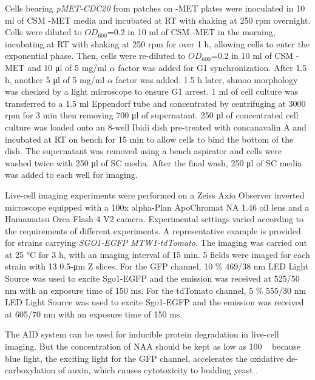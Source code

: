 Cells bearing \textit{pMET-CDC20} from patches on -MET plates were inoculated in 10 \si{\milli\litre} of CSM -MET media and incubated at RT with shaking at 250 rpm overnight. Cells were diluted to $OD_{600}$=0.2 in 10 \si{\milli\litre} of CSM -MET in the morning, incubating at RT with shaking at 250 rpm for over 1 \si{\hour}, allowing cells to enter the exponential phase. Then, cells were re-diluted to $OD_{600}$=0.2 in 10 \si{\milli\litre} of CSM -MET and 10 \si{\micro\litre} of 5 \si{\milli\gram/\milli\litre} $\alpha$ factor was added for G1 synchronization. After 1.5 \si{\hour}, another 5 \si{\micro\litre} of 5 \si{\milli\gram/\milli\litre} $\alpha$ factor was added. 1.5 \si{\hour} later, shmoo morphology was checked by a light microscope to ensure G1 arrest. 1 \si{\milli\litre} of cell culture was transferred to a 1.5 \si{\milli\litre} Eppendorf tube and concentrated by centrifuging at 3000 rpm for 3 \si{\minute} then removing 700 \si{\micro\litre} of supernatant. 250 \si{\micro\litre} of concentrated cell culture was loaded onto an 8-well Ibidi dish pre-treated with concanavalin A and incubated at RT on bench for 15 \si{\minute} to allow cells to bind the bottom of the dish. The supernatant was removed using a bench aspirator and cells were washed twice with 250 \si{\micro\litre} of SC media. After the final wash, 250 \si{\micro\litre} of SC media was added to each well for imaging. 

Live-cell imaging experiments were performed on a Zeiss Axio Observer inverted microscope equipped with a 100x alpha-Plan ApoChromat NA 1.46 oil lens and a Hamamatsu Orca Flash 4 V2 camera. Experimental settings varied according to the requirements of different experiments. A representative example is provided for strains carrying \textit{SGO1-EGFP} \textit{MTW1-tdTomato}. The imaging was carried out at 25 \si{\celsius} for 3 \si{\hour}, with an imaging interval of 15 \si{\minute}. 5 fields were imaged for each strain with 13 0.5-\si{\micro\metre} Z slices. For the GFP channel, 10 \% 469/38 \si{\nano\metre} LED Light Source was used to excite Sgo1-EGFP and the emission was received at 525/50 \si{\nano\metre} with an exposure time of 150 \si{\milli\second}. For the tdTomato channel, 5 \% 555/30 \si{\nano\metre} LED Light Source was used to excite Sgo1-EGFP and the emission was received at 605/70 \si{\nano\metre} with an exposure time of 150 \si{\milli\second}. 

The AID system can be used for inducible protein degradation in live-cell imaging. But the concentration of NAA should be kept as low as 100 \si{\micro\Molar} because blue light, the exciting light for the GFP channel, accelerates the oxidative de-carboxylation of auxin, which causes cytotoxicity to budding yeast \citep{Papagiannakis2017QuantitativeCells}. 

